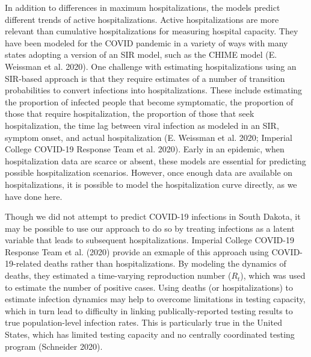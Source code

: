 \documentclass[
]{article}
\begin{document}
In addition to differences in maximum hospitalizations, the models predict different trends of active hospitalizations. Active hospitalizations are more relevant than cumulative hospitalizations for measuring hospital capacity. They have been modeled for the COVID pandemic in a variety of ways with many states adopting a version of an SIR model, such as the CHIME model (E. Weissman et al. 2020). One challenge with estimating hospitalizations using an SIR-based approach is that they require estimates of a number of transition probabilities to convert infections into hospitalizations. These include estimating the proportion of infected people that become symptomatic, the proportion of those that require hospitalization, the proportion of those that seek hospitalization, the time lag between viral infection as modeled in an SIR, symptom onset, and actual hospitalization (E. Weissman et al. 2020; Imperial College COVID-19 Response Team et al. 2020). Early in an epidemic, when hospitalization data are scarce or absent, these models are essential for predicting possible hospitalization scenarios. However, once enough data are available on hospitalizations, it is possible to model the hospitalization curve directly, as we have done here.

Though we did not attempt to predict COVID-19 infections in South Dakota, it may be possible to use our approach to do so by treating infections as a latent variable that leads to subsequent hospitalizations. Imperial College COVID-19 Response Team et al. (2020) provide an exmaple of this approach using COVID-19-related deaths rather than hospitalizations. By modeling the dynamics of deaths, they estimated a time-varying reproduction number (\(R_t\)), which was used to estimate the number of positive cases. Using deaths (or hospitalizations) to estimate infection dynamics may help to overcome limitations in testing capacity, which in turn lead to difficulty in linking publically-reported testing results to true population-level infection rates. This is particularly true in the United States, which has limited testing capacity and no centrally coordinated testing program (Schneider 2020).
\end{document}
